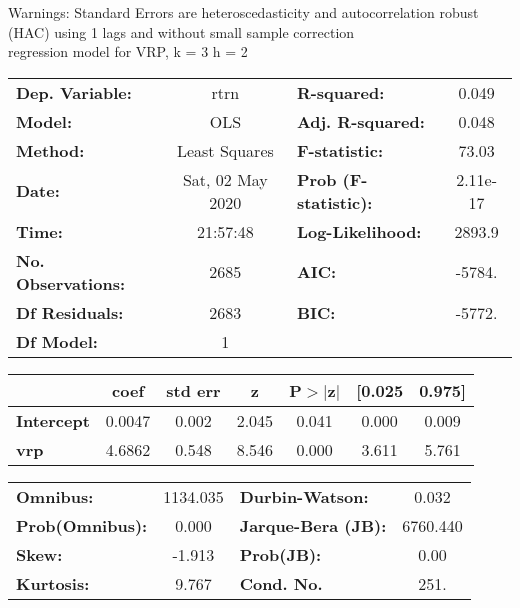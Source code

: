 Warnings: \newline
 [1] Standard Errors are heteroscedasticity and autocorrelation robust (HAC) using 1 lags and without small sample correction\\ 

regression model for VRP, k = 3 h = 2\begin{center}
\begin{tabular}{lclc}
\toprule
\textbf{Dep. Variable:}    &       rtrn       & \textbf{  R-squared:         } &     0.049   \\
\textbf{Model:}            &       OLS        & \textbf{  Adj. R-squared:    } &     0.048   \\
\textbf{Method:}           &  Least Squares   & \textbf{  F-statistic:       } &     73.03   \\
\textbf{Date:}             & Sat, 02 May 2020 & \textbf{  Prob (F-statistic):} &  2.11e-17   \\
\textbf{Time:}             &     21:57:48     & \textbf{  Log-Likelihood:    } &    2893.9   \\
\textbf{No. Observations:} &        2685      & \textbf{  AIC:               } &    -5784.   \\
\textbf{Df Residuals:}     &        2683      & \textbf{  BIC:               } &    -5772.   \\
\textbf{Df Model:}         &           1      & \textbf{                     } &             \\
\bottomrule
\end{tabular}
\begin{tabular}{lcccccc}
                   & \textbf{coef} & \textbf{std err} & \textbf{z} & \textbf{P$> |$z$|$} & \textbf{[0.025} & \textbf{0.975]}  \\
\midrule
\textbf{Intercept} &       0.0047  &        0.002     &     2.045  &         0.041        &        0.000    &        0.009     \\
\textbf{vrp}       &       4.6862  &        0.548     &     8.546  &         0.000        &        3.611    &        5.761     \\
\bottomrule
\end{tabular}
\begin{tabular}{lclc}
\textbf{Omnibus:}       & 1134.035 & \textbf{  Durbin-Watson:     } &    0.032  \\
\textbf{Prob(Omnibus):} &   0.000  & \textbf{  Jarque-Bera (JB):  } & 6760.440  \\
\textbf{Skew:}          &  -1.913  & \textbf{  Prob(JB):          } &     0.00  \\
\textbf{Kurtosis:}      &   9.767  & \textbf{  Cond. No.          } &     251.  \\
\bottomrule
\end{tabular}
\end{center}

